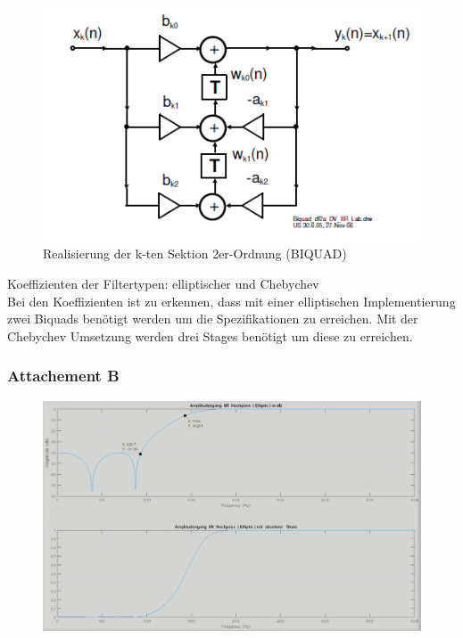 \begin{figure}[h]
\centering
\includegraphics[width=0.7\linewidth]{Bilder/BIQUAD}
\caption{ Realisierung der k-ten Sektion 2er-Ordnung (BIQUAD)}
\label{fig:BIQUAD}
\end{figure}

\clearpage



\noindent Koeffizienten der Filtertypen: elliptischer und Chebychev\\
Bei den Koeffizienten ist zu erkennen, dass mit einer elliptischen Implementierung zwei Biquads benötigt werden um die Spezifikationen zu erreichen. Mit der Chebychev Umsetzung werden drei Stages benötigt um diese zu erreichen.\\






\clearpage

\subsubsection{Attachement B}

\begin{figure}[h]
\centering
\includegraphics[width=0.7\linewidth]{Bilder/Attachment_B_ELLIP}
\caption{}
\label{fig:Attachment_B_ELLIP}
\end{figure}


